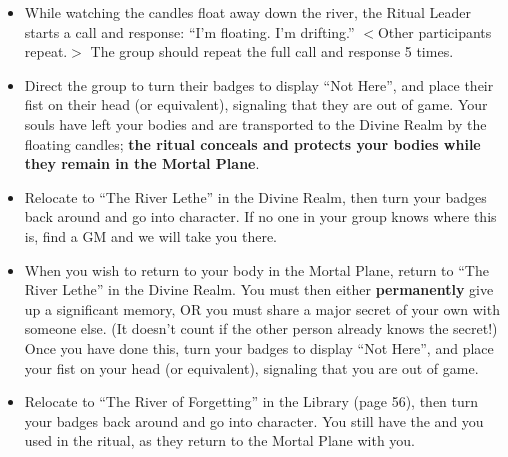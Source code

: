 \documentclass[green]{GL2020}
\begin{document}
\begin{enumerate}
\begin{itemize}
        \item While watching the candles float away down the river, the Ritual Leader starts a call and response: ``I'm floating. I'm drifting.'' $<$Other participants repeat.$>$ The group should repeat the full call and response 5 times.
        \item Direct the group to turn their badges to display ``Not Here'', and place their fist on their head (or equivalent), signaling that they are out of game. Your souls have left your bodies and are transported to the Divine Realm by the floating candles; \textbf{the ritual conceals and protects your bodies while they remain in the Mortal Plane}.
        \item Relocate to ``The River Lethe'' in the Divine Realm, then turn your badges back around and go into character. If no one in your group knows where this is, find a GM and we will take you there.
        \item When you wish to return to your body in the Mortal Plane, return to ``The River Lethe'' in the Divine Realm. You must then either \textbf{permanently} give up a significant memory, OR you must share a major secret of your own with someone else. (It doesn't count if the other person already knows the secret!) Once you have done this, turn your badges to display ``Not Here'', and place your fist on your head (or equivalent), signaling that you are out of game. 
       \item Relocate to ``The River of Forgetting'' in the Library (page 56), then turn your badges back around and go into character. You still have the \iRitualCandle{} and \iGlassVial{} you used in the ritual, as they return to the Mortal Plane with you.
    \end{itemize}
\end{enumerate}
\end{document}
